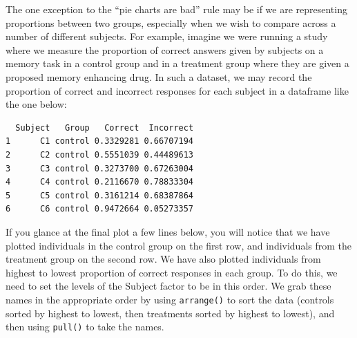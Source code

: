 \documentclass[
  letterpaper,
  DIV=11,
  numbers=noendperiod]{scrreprt}
\newenvironment{Shaded}{\begin{snugshade}}{\end{snugshade}}
\newcommand{\AttributeTok}[1]{\textcolor[rgb]{0.40,0.45,0.13}{#1}}
\newcommand{\CommentTok}[1]{\textcolor[rgb]{0.37,0.37,0.37}{#1}}
\newcommand{\DecValTok}[1]{\textcolor[rgb]{0.68,0.00,0.00}{#1}}
\newcommand{\FunctionTok}[1]{\textcolor[rgb]{0.28,0.35,0.67}{#1}}
\newcommand{\NormalTok}[1]{\textcolor[rgb]{0.00,0.23,0.31}{#1}}
\newcommand{\OtherTok}[1]{\textcolor[rgb]{0.00,0.23,0.31}{#1}}
\newcommand{\SpecialCharTok}[1]{\textcolor[rgb]{0.37,0.37,0.37}{#1}}
\newcommand{\StringTok}[1]{\textcolor[rgb]{0.13,0.47,0.30}{#1}}
\begin{document}
The one exception to the ``pie charts are bad'' rule may be if we are
representing proportions between two groups, especially when we wish to
compare across a number of different subjects. For example, imagine we
were running a study where we measure the proportion of correct answers
given by subjects on a memory task in a control group and in a treatment
group where they are given a proposed memory enhancing drug. In such a
dataset, we may record the proportion of correct and incorrect responses
for each subject in a dataframe like the one below:

\begin{Shaded}
\end{Shaded}

\begin{verbatim}
  Subject   Group   Correct  Incorrect
1      C1 control 0.3329281 0.66707194
2      C2 control 0.5551039 0.44489613
3      C3 control 0.3273700 0.67263004
4      C4 control 0.2116670 0.78833304
5      C5 control 0.3161214 0.68387864
6      C6 control 0.9472664 0.05273357
\end{verbatim}

If you glance at the final plot a few lines below, you will notice that
we have plotted individuals in the control group on the first row, and
individuals from the treatment group on the second row. We have also
plotted individuals from highest to lowest proportion of correct
responses in each group. To do this, we need to set the levels of the
Subject factor to be in this order. We grab these names in the
appropriate order by using \texttt{arrange()} to sort the data (controls
sorted by highest to lowest, then treatments sorted by highest to
lowest), and then using \texttt{pull()} to take the names.
\end{document}
